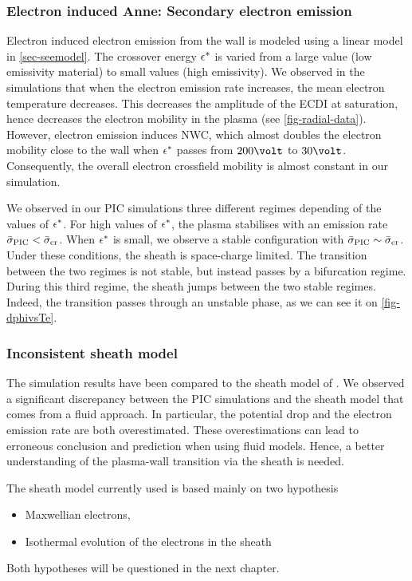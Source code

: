  
  \subsubsection*{Electron induced {\bf Anne: Secondary} electron emission}
  
  Electron induced  electron  emission from the wall is modeled using a linear model in \cref{sec-seemodel}.
  The crossover energy $\epsilon^{*}$ is varied from a large value (low emissivity material) to small values (high emissivity).
  We observed in the simulations that when the electron emission rate increases, the mean electron temperature decreases.
  This decreases the amplitude of the \ac{ECDI} at saturation, hence decreases the electron mobility in the plasma (see \cref{fig-radial-data}).
  However, electron emission induces \ac{NWC}, which almost doubles the electron mobility close to the wall when $\epsilon^{*}$ passes from $200\volt$ to $30\volt$.
  Consequently, the overall electron crossfield mobility is almost constant in our simulation.
  
  We observed in our \ac{PIC} simulations three different regimes depending of the values of $\epsilon^{*}$.
  For high values of $\epsilon^{*}$, the plasma stabilises with an emission rate $ \bar{\sigma }_{\rm PIC} <  \bar{\sigma }_{\rm cr}$.
  When $\epsilon^{*}$ is small, we observe a stable configuration with $ \bar{\sigma }_{\rm PIC} \sim  \bar{\sigma }_{\rm cr}$.
  Under these conditions, the sheath is space-charge limited.
  The transition between the two regimes is not stable, but instead passes by a bifurcation regime.
  During this third regime, the sheath jumps between the two stable regimes.
  Indeed, the transition passes through an unstable phase, as we can see it on \cref{fig-dphivsTe}.
  

  \subsubsection*{Inconsistent sheath model }
  
  The simulation results have been compared to the sheath model of \citet{hobbs1967}.
  We observed a significant discrepancy between the \ac{PIC} simulations and the sheath model that comes from a fluid approach.
  In particular, the potential drop and the electron emission rate are both overestimated.
  These overestimations can lead to erroneous conclusion and prediction when using fluid models.
  Hence, a better understanding of the plasma-wall transition via the sheath is needed.
  
  The sheath model currently used is based mainly on two hypothesis
  \begin{itemize}
    \item Maxwellian electrons,
    \item Isothermal evolution of the electrons in the sheath
  \end{itemize}
  
  Both hypotheses will be questioned in the next chapter.
  
